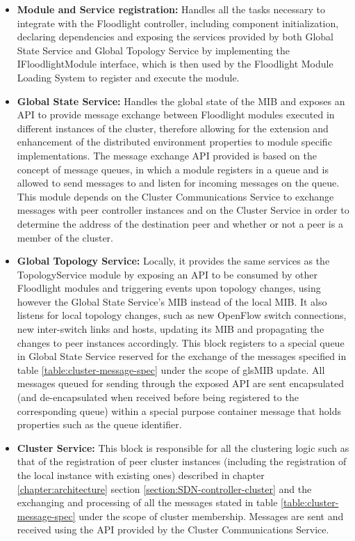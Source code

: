\begin{itemize}
	\item \textbf{Module and Service registration:} Handles all the tasks necessary to integrate with the Floodlight controller, including component initialization, declaring dependencies and exposing the services provided by both Global State Service and Global Topology Service by implementing the IFloodlightModule interface, which is then used by the Floodlight Module Loading System to register and execute the module.
	\item \textbf{Global State Service:} Handles the global state of the \gls{MIB} and exposes an \gls{API} to provide message exchange between Floodlight modules executed in different instances of the cluster, therefore allowing for the extension and enhancement of the distributed environment properties to module specific implementations. The message exchange \gls{API} provided is based on the concept of message queues, in which a module registers in a queue and is allowed to send messages to and listen for incoming messages on the queue. This module depends on the Cluster Communications Service to exchange messages with peer controller instances and on the Cluster Service in order to determine the address of the destination peer and whether or not a peer is a member of the cluster.
	\item \textbf{Global Topology Service:} Locally, it provides the same services as the TopologyService module by exposing an \gls{API} to be consumed by other Floodlight modules and triggering events upon topology changes, using however the Global State Service's \gls{MIB} instead of the local \gls{MIB}. It also listens for local topology changes, such as new OpenFlow switch connections, new inter-switch links and hosts, updating its \gls{MIB} and propagating the changes to peer instances accordingly. This block registers to a special queue in Global State Service reserved for the exchange of the messages specified in table \ref{table:cluster-message-spec} under the scope of gls{MIB} update. All messages queued for sending through the exposed \gls{API} are sent encapsulated (and de-encapsulated when received before being registered to the corresponding queue) within a special purpose container message that holds properties such as the queue identifier.
	\item \textbf{Cluster Service:} This block is responsible for all the clustering logic such as that of the registration of peer cluster instances (including the registration of the local instance with existing ones) described in chapter \ref*{chapter:architecture} section \ref{section:SDN-controller-cluster} and the exchanging and processing of all the messages stated in table \ref{table:cluster-message-spec} under the scope of cluster membership. Messages are sent and received using the \gls{API} provided by the Cluster Communications Service.

\end{itemize}
